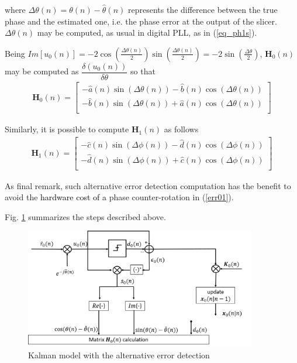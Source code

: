 where $\Delta\theta(n)=\theta(n)-\hat{\theta}(n)$ represents the difference between the true phase and the estimated one, i.e. the phase error at the output of the slicer. $\Delta\theta(n)$ may be computed, as usual in digital PLL, as in (\ref{eq_ph1s}).

Being $Im\left[u_0(n)\right]=-2\cos(\frac{\Delta\theta(n)}{2})\sin(\frac{\Delta\theta(n)}{2})=-2\sin\left(\frac{\Delta\theta}{2}\right)$, $\mathbf{H}_0(n)$ may be computed as $\dfrac{\delta(u_0(n))}{\delta\theta}$ so that
\begin{equation}
\begin{array}{c}
\mathbf{H}_0(n)=\left[\begin{matrix}
-\hat{a}(n)\sin(\Delta\theta(n))-\hat{b}(n)\cos(\Delta\theta(n))\\
-\hat{b}(n)\sin(\Delta\theta(n))+\hat{a}(n)\cos(\Delta\theta(n)) \\
\end{matrix}\right]
\end{array}
\label{eq_ssH0new_b}
\end{equation}

Similarly, it is possible to compute $\mathbf{H}_1(n)$ as follows
\begin{equation}
\begin{array}{c}
\mathbf{H}_1(n)=\left[\begin{matrix}
-\hat{c}(n)\sin(\Delta\phi(n))-\hat{d}(n)\cos(\Delta\phi(n))  \\
-\hat{d}(n)\sin(\Delta\phi(n))+\hat{c}(n)\cos(\Delta\phi(n))  \\
\end{matrix}\right]
\end{array}
\label{eq_ssH1new_b}
\end{equation}

As final remark, such alternative error detection computation has the benefit to avoid the \textcolor{black}{hardware cost of a} phase counter-rotation in (\ref{err01}).


Fig. \ref{Hnew_fig} summarizes the steps described above.


\begin{figure}
	\includegraphics[width=0.9\textwidth]{figures/fig_red_kalman/Hnew.png}
	\caption{Kalman model with the alternative error detection}
	\label{Hnew_fig}      
\end{figure}

